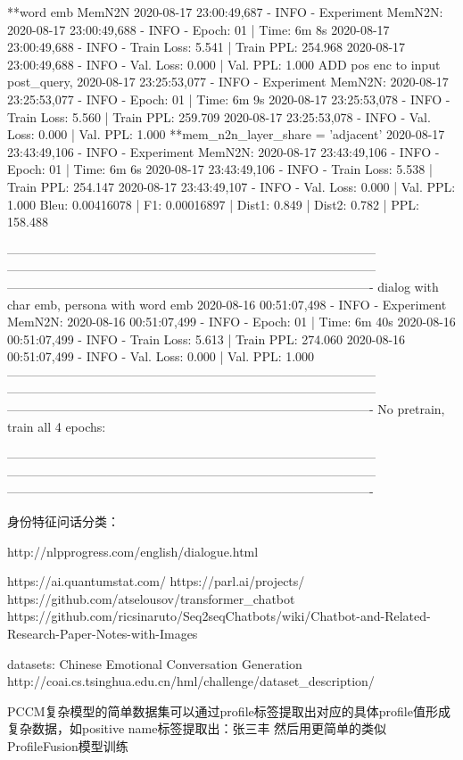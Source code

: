 \documentclass[letterpaper]{article} %
\begin{document}
\begin{CJK*}{UTF8}{gbsn}
**word emb MemN2N
2020-08-17 23:00:49,687 - INFO - Experiment MemN2N: 
2020-08-17 23:00:49,688 - INFO - Epoch: 01 | Time: 6m 8s
2020-08-17 23:00:49,688 - INFO - 	Train Loss: 5.541 | Train PPL: 254.968
2020-08-17 23:00:49,688 - INFO - 	 Val. Loss: 0.000 |  Val. PPL:   1.000
    ADD pos enc to input post_query, %
    2020-08-17 23:25:53,077 - INFO - Experiment MemN2N: 
    2020-08-17 23:25:53,077 - INFO - Epoch: 01 | Time: 6m 9s
    2020-08-17 23:25:53,078 - INFO - 	Train Loss: 5.560 | Train PPL: 259.709
    2020-08-17 23:25:53,078 - INFO - 	 Val. Loss: 0.000 |  Val. PPL:   1.000
    **mem_n2n_layer_share = 'adjacent'
    2020-08-17 23:43:49,106 - INFO - Experiment MemN2N: 
    2020-08-17 23:43:49,106 - INFO - Epoch: 01 | Time: 6m 6s
    2020-08-17 23:43:49,106 - INFO - 	Train Loss: 5.538 | Train PPL: 254.147
    2020-08-17 23:43:49,107 - INFO - 	 Val. Loss: 0.000 |  Val. PPL:   1.000
    Bleu: 0.00416078 | F1: 0.00016897 | Dist1: 0.849 | Dist2: 0.782 | PPL: 158.488

-----------------------------------------------------------------------------------------
-----------------------------------------------------------------------------------------
----------------------------------------------------------------------------------------
dialog with char emb, persona with word emb
2020-08-16 00:51:07,498 - INFO - Experiment MemN2N: 
2020-08-16 00:51:07,499 - INFO - Epoch: 01 | Time: 6m 40s
2020-08-16 00:51:07,499 - INFO - 	Train Loss: 5.613 | Train PPL: 274.060
2020-08-16 00:51:07,499 - INFO - 	 Val. Loss: 0.000 |  Val. PPL:   1.000
-----------------------------------------------------------------------------------------
-----------------------------------------------------------------------------------------
----------------------------------------------------------------------------------------
No pretrain, train all 4 epochs:

-----------------------------------------------------------------------------------------
-----------------------------------------------------------------------------------------
----------------------------------------------------------------------------------------



身份特征问话分类：


http://nlpprogress.com/english/dialogue.html

https://ai.quantumstat.com/
https://parl.ai/projects/
https://github.com/atselousov/transformer\_chatbot
https://github.com/ricsinaruto/Seq2seqChatbots/wiki/Chatbot-and-Related-Research-Paper-Notes-with-Images


datasets:
Chinese Emotional Conversation Generation
http://coai.cs.tsinghua.edu.cn/hml/challenge/dataset\_description/


PCCM复杂模型的简单数据集可以通过profile标签提取出对应的具体profile值形成复杂数据，如positive name标签提取出：张三丰
然后用更简单的类似ProfileFusion模型训练

\clearpage\end{CJK*}
\end{document}
